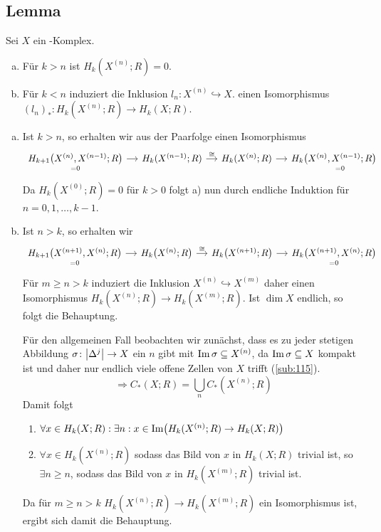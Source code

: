 \subsection{Lemma} %
\label{sub:129}
Sei $X$ ein \CW-Komplex.
\begin{enumerate}[a)]
	\item Für $k >n$ ist $H_k(X^{(n)};R)=0$.
	\item Für $k <n$ induziert die Inklusion $l_n : X^{(n)} \hookrightarrow X$. einen Isomorphismus $(l_n)_* : H_k(X^{(n)};R) \to H_k(X;R)$.
\end{enumerate}
\begin{enumerate}[a)]
	\item Ist $k>n$, so erhalten wir aus der Paarfolge einen Isomorphismus 
	\[
		\begin{tikzcd}[column sep=small]
			\underset{=0}{H_{k+1}\enbrace*{X^{(n)}, X^{(n-1)};R}} \rar &  H_k(X^{(n-1)};R) \rar["\cong"] & H_k(X^{(n)};R) \rar 
			& H_k \underset{=0}{\enbrace*{X^{(n)}, X^{(n-1)};R} }
		\end{tikzcd}
	\]
	Da $H_k(X^{(0)};R)=0$ für $k>0$ folgt a) nun durch endliche Induktion für $n=0,1, \ldots , k-1$.
	\item Ist $n >k$, so erhalten wir 
	\[
		\begin{tikzcd}[column sep=small]
			\underset{=0}{H_{k+1} \enbrace*{X^{(n+1)},X^{(n)};R}} \rar & H_k \enbrace*{X^{(n)};R} \rar["\cong"] & H_k \enbrace*{X^{(n+1)};R} \rar 
			& \underset{=0}{H_k \enbrace*{X^{(n+1)},X^{(n)};R}   }
		\end{tikzcd}
	\]
	Für $m \ge n >k$ induziert die Inklusion $X^{(n)} \hookrightarrow X^{(m)}$ daher einen Isomorphismus $H_k(X^{(n)};R) \to H_k(X^{(m)};R)$. Ist $\dim X$ endlich, so folgt
	die Behauptung. 
	
	Für den allgemeinen Fall beobachten wir zunächst, dass es zu jeder stetigen Abbildung $\sigma\colon\abs*{\Delta^j}\to X$ ein $n$ gibt mit $\operatorname{Im} \sigma \subseteq X^{(n)}$,
	da $\operatorname{Im} \sigma \subseteq X$ kompakt ist und daher nur endlich viele offene Zellen von $X$ trifft (\ref{sub:115}).
	\[
		\Longrightarrow C_*(X;R) = \bigcup_n C_*(X^{(n)};R)
	\]
	Damit folgt \begin{enumerate}[(1)]
		\item $\forall x \in H_k(X;R) : \exists n : x \in \im \enbrace*{H_k(X^{(n)};R) \to H_k(X;R)} $
		\item $\forall x\in H_k(X^{(n)};R)$ sodass das Bild von $x$ in $H_k(X;R)$ trivial ist, so $\exists n \ge n$, sodass das Bild von $x$ in $H_k(X^{(m)};R)$ trivial ist.
	\end{enumerate}
	Da für $m \ge n >k$ $H_k(X^{(n)};R) \to H_k(X^{(m)};R)$ ein Isomorphismus ist, ergibt sich damit die Behauptung. \bewende
\end{enumerate}

